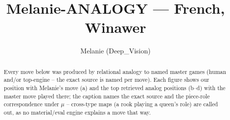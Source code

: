 \documentclass[11pt]{article}
\title{Melanie-ANALOGY — French, Winawer}
\author{Melanie (Deep\_Vision)}
\date{}
\begin{document}
\maketitle

\begin{abstract}Every move below was produced by relational analogy to named master games (human and/or top-engine -- the exact source is named per move). Each figure shows our position with Melanie's move (a) and the top retrieved analog positions (b--d) with the master move played there; the caption names the exact source and the piece-role correspondence under $\mu$ -- cross-type maps (a rook playing a queen's role) are called out, as no material/eval engine explains a move that way.\end{abstract}

\begin{figure}[p]\centering
\begin{subfigure}{0.46\textwidth}\centering
\resizebox{\linewidth}{!}{%
\newchessgame
\chessboard[
  setfen={rnbqk2r/pp2nppp/4p3/2PpP3/8/P1P5/2P2PPP/R1BQKBNR b KQkq - 0 7},
  showmover=false,
  pgfstyle=straightmove, color=movearrow, markmove={d8-d7}
]}
\caption{}
\end{subfigure}\hfill
\begin{subfigure}{0.46\textwidth}\centering
\resizebox{\linewidth}{!}{%
\newchessgame
\chessboard[
  setfen={r1bqkb1r/p1pp1ppp/2p2n2/4P3/8/8/PPP2PPP/RNBQKB1R b KQkq - 0 6},
  showmover=false,
  pgfstyle=straightmove, color=movearrow, markmove={d8-e7}
]}
\caption{}
\end{subfigure}
\\[4pt]
\begin{subfigure}{0.46\textwidth}\centering
\resizebox{\linewidth}{!}{%
\newchessgame
\chessboard[
  setfen={r1bqkb1r/p1pp1ppp/2p2n2/4P3/8/8/PPP2PPP/RNBQKB1R b KQkq - 0 6},
  showmover=false,
  pgfstyle=straightmove, color=movearrow, markmove={d8-e7}
]}
\caption{}
\end{subfigure}\hfill
\begin{subfigure}{0.46\textwidth}\centering
\resizebox{\linewidth}{!}{%
\newchessgame
\chessboard[
  setfen={r1bqkb1r/p1pp1ppp/2p2n2/4P3/8/8/PPP2PPP/RNBQKB1R b KQkq - 0 6},
  showmover=false,
  pgfstyle=straightmove, color=movearrow, markmove={d8-e7}
]}
\caption{}
\end{subfigure}

\end{figure}
\end{document}
